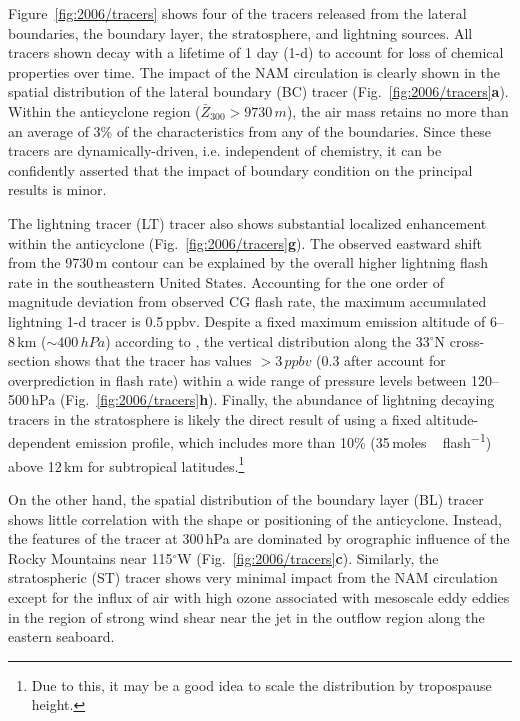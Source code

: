
Figure~\ref{fig:2006/tracers} shows four of the tracers released from the lateral boundaries, the boundary layer, the stratosphere, and
lightning sources. All tracers shown decay with a lifetime of 1 day (1-d) to account for loss of chemical properties over time. The impact of the NAM circulation is clearly shown
in the spatial distribution of the lateral boundary (BC) tracer (Fig.~\ref{fig:2006/tracers}{\bf a}). Within the anticyclone region ($\bar{Z}_{300}
>9730\,\unit{m}$), the air mass retains no more than an average of 3\% of the characteristics from any of the boundaries. Since these
tracers are dynamically-driven, i.e. independent of chemistry, it can be confidently asserted that the impact of boundary condition on the principal results is minor.

The lightning  tracer (LT) tracer also shows substantial localized enhancement within the anticyclone (Fig.~\ref{fig:2006/tracers}{\bf g}).
The observed eastward shift from the 9730\,\unit{m} contour can be explained by the overall higher lightning flash rate in the southeastern 
United States. Accounting for the one order of magnitude deviation from observed CG flash rate, the maximum accumulated lightning
1-d tracer is 0.5\,\unit{ppbv}. Despite a fixed maximum emission altitude of 6--8\,\unit{km} ($\sim400\,\unit{hPa}$) according to
\citet{Ott:2010lo}, the vertical distribution along the 33$^\circ$N cross-section shows that the tracer has values $>3\,\unit{ppbv}$ (0.3
after account for overprediction in flash rate) within a wide range of pressure levels between 120--500\,\unit{hPa}
(Fig.~\ref{fig:2006/tracers}{\bf h}). Finally, the abundance of lightning decaying tracers in the stratosphere is likely the direct result of using a
fixed altitude-dependent emission profile, which includes more than 10\% (35\,\unit{moles\,flash^{-1}}) above 12\,\unit{km} for
subtropical latitudes.\footnote{Due to this, it may be a good idea to scale the \citet{Ott:2010lo} distribution by tropospause height.}

On the other hand, the spatial distribution of the boundary layer (BL) tracer shows little correlation with the shape or positioning of the anticyclone. Instead,
the features of the tracer at 300\,\unit{hPa} are dominated by orographic influence of the Rocky Mountains near 115$^\circ$W (Fig.~\ref{fig:2006/tracers}{\bf c}).
Similarly, the stratospheric (ST) tracer shows very minimal impact from the NAM circulation except for the influx of air with high ozone associated with mesoscale eddy
eddies in the region of strong wind shear near the jet in the outflow region along the eastern seaboard.

